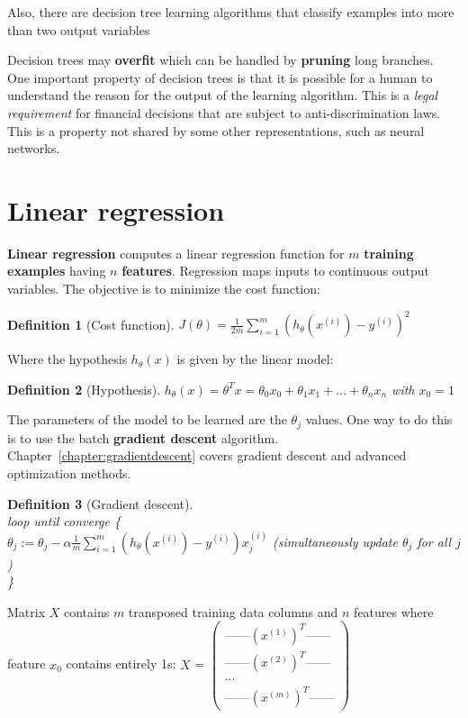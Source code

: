 \documentclass{report}
\newtheorem{definition}{Definition}[section]
\begin{document}
Also, there are decision tree learning algorithms that classify examples into more than two output variables

Decision trees may {\bf overfit} which can be handled by {\bf pruning} long branches. \\
One important property of decision trees is that it is possible for a human to understand the reason for the output of the learning algorithm. This is a {\em legal requirement} for financial decisions that are subject to anti-discrimination laws. This is a property not shared by some other representations, such as neural networks.



\section{Linear regression}
{\bf Linear regression} computes a linear regression function for $m$ {\bf training examples} having $n$ {\bf features}.
Regression maps inputs to continuous output variables.
The objective is to minimize the cost function:
\begin{definition}[Cost function]
$J(\theta) = \frac{1}{2m}\sum_{i=1}^m(h_\theta(x^{(i)})-y^{(i)})^2$
\end{definition}

Where the hypothesis $h_\theta(x)$ is given by the linear model:
\begin{definition}[Hypothesis]
$h_\theta(x) = \theta^{T}x = \theta_0 x_0 + \theta_1 x_1 + ... + \theta_n x_n$ with $x_0 = 1$
\end{definition}

The parameters of the model to be learned are the $\theta_j$ values. One way to do this is to use the batch {\bf gradient descent} algorithm.
Chapter~\ref{chapter:gradientdescent} covers gradient descent and advanced optimization methods.

\begin{definition}[Gradient descent] ~\\
loop until converge \{ \\
$\theta_j := \theta_j - \alpha \frac{1}{m}\sum_{i=1}^m(h_\theta(x^{(i)})-y^{(i)})x_j^{(i)}$ (simultaneously update $\theta_j$ for all $j$) \\
\}
\end{definition}

Matrix $X$ contains $m$ transposed training data columns and $n$ features where feature $x_0$ contains entirely 1s:
$X$ = $\begin{pmatrix}
\mbox{------} (x^{(1)})^T \mbox{------} \\
\mbox{------} (x^{(2)})^T \mbox{------} \\
... \\
\mbox{------} (x^{(m)})^T \mbox{------}
\end{pmatrix}$
\end{document}

